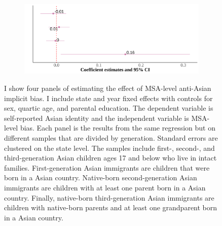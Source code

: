 \begin{center}
\begin{figure}[!htb]
\begin{subfigure}{.48\textwidth}
\centering
\includegraphics[width=.9\linewidth]{msa-skin-iat-regression-third-gen.png}
\end{subfigure}
\caption*{\footnotesize{I show four panels of estimating the effect of MSA-level anti-Asian implicit bias. I include state and year fixed effects with controls for sex, quartic age, and parental education. The dependent variable is self-reported Asian identity and the independent variable is MSA-level bias. Each panel is the results from the same regression but on different samples that are divided by generation. Standard errors are clustered on the state level. The samples include first-, second-, and third-generation Asian children ages 17 and below who live in intact families. First-generation Asian immigrants are children that were born in a Asian country. Native-born second-generation Asian immigrants are children with at least one parent born in a Asian country. Finally, native-born third-generation Asian immigrants are children with native-born parents and at least one grandparent born in a Asian country.}}
\end{figure}
\end{center}

\pagebreak
\newpage

